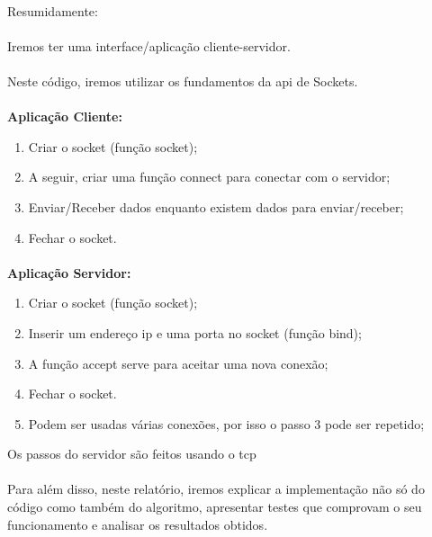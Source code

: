 \documentclass[a4paper,11pt,onecolumn,oneside]{article}
\begin{document}
\paragraph{ }
Resumidamente:
\paragraph{ }
Iremos ter uma interface/aplicação cliente-servidor.
\paragraph{ }
Neste código, iremos utilizar os fundamentos da \ac{api} de Sockets.
\paragraph{ }
\textbf{Aplicação Cliente:}

\renewcommand{\theenumi}{\arabic{enumi}}
\begin{enumerate}
\item Criar o socket (função socket);
\item A seguir, criar uma função connect para conectar com o servidor;
\item Enviar/Receber dados enquanto existem dados para enviar/receber;
\item Fechar o socket. 
\end{enumerate}

\paragraph{ }
\textbf{Aplicação Servidor:}
\renewcommand{\theenumi}{\arabic{enumi}}
\begin{enumerate}
\item Criar o socket (função socket);
\item Inserir um endereço \ac{ip} e uma porta no socket (função bind);
\item A função accept serve para aceitar uma nova conexão;
\item Fechar o socket.
\item Podem ser usadas várias conexões, por isso o passo 3 pode ser repetido;
\end{enumerate}

Os passos do servidor são feitos usando o \ac{tcp} 
\paragraph{ }
Para além disso, neste relatório, iremos explicar a implementação não só do código como também do algoritmo, apresentar testes que comprovam o seu funcionamento e analisar os resultados obtidos.
\end{document}

